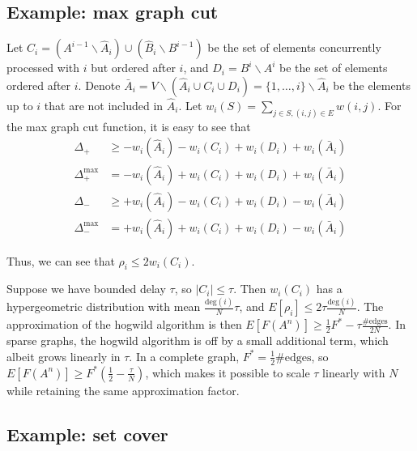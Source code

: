\subsection{Example: max graph cut}
Let $C_i = (A^{i-1}\backslash \hat{A}_i) \cup (\hat{B}_i\backslash B^{i-1})$ be the set of elements concurrently processed with $i$ but ordered after $i$, and $D_i = B^i\backslash A^i$ be the set of elements ordered after $i$.
Denote $\bar{A}_i = V\backslash (\hat{A}_i\cup C_i\cup D_i) = \{1,\dots,i\}\backslash \hat{A}_i$ be the elements up to $i$ that are not included in $\hat{A}_i$.
Let $w_i(S) = \sum_{j\in S, (i,j)\in E} w(i,j)$.
For the max graph cut function, it is easy to see that
\begin{align*}
\Delta_+        &\geq - w_i(\hat{A}_i) -w_i(C_i) + w_i(D_i) + w_i(\bar{A}_i)\\
\Delta_+^{\max} &=    - w_i(\hat{A}_i) + w_i(C_i) + w_i(D_i) + w_i(\bar{A}_i)\\
\Delta_-        &\geq + w_i(\hat{A}_i) - w_i(C_i) + w_i(D_i) - w_i(\bar{A}_i)\\
\Delta_-^{\max} &= + w_i(\hat{A}_i) + w_i(C_i) + w_i(D_i) - w_i(\bar{A}_i)
\end{align*}

Thus, we can see that $\rho_i \leq 2w_i(C_i)$.

Suppose we have bounded delay $\tau$, so $|C_i| \leq \tau$.
Then $w_i(C_i)$ has a hypergeometric distribution with mean $\frac{\text{deg}(i)}{N}\tau$, and $E[\rho_i] \leq 2\tau\frac{\text{deg}(i)}{N}$.
The approximation of the hogwild algorithm is then $E[F(A^n)] \geq \frac{1}{2} F^* - \tau\frac{\#\text{edges}}{2N}$.
In sparse graphs, the hogwild algorithm is off by a small additional term, which albeit grows linearly in $\tau$.
In a complete graph, $F^* = \frac{1}{2}\#\text{edges}$, so $E[F(A^n)] \geq F^*\left(\frac{1}{2} - \frac{\tau}{N}\right)$, which makes it possible to scale $\tau$ linearly with $N$ while retaining the same approximation factor.



\subsection{Example: set cover}

